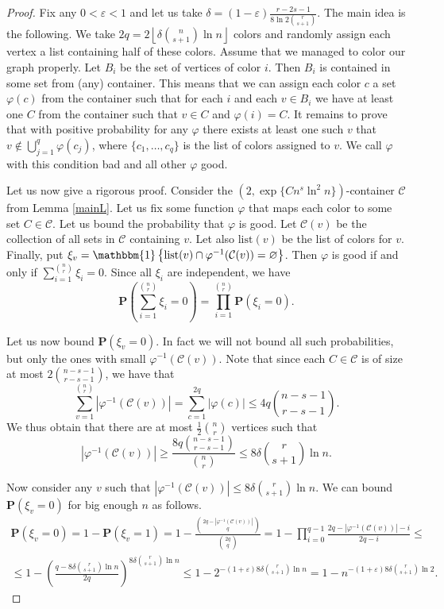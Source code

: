 \documentclass[10pt,a4paper]{article}
\theoremstyle{remark}
\theoremstyle{definition}
\newcommand{\mP}{\mathbf{P}}
\newcommand{\lst}{\mathrm{list}}
\newcommand{\ind}[1]{\mathbbm{1}\left\{#1\right\}}
\newcommand{\skob}[1]{\left(#1\right)}
\newcommand{\flr}[1]{\left\lfloor#1\right\rfloor}
\begin{document}
\begin{proof}
    Fix any $0 < \varepsilon < 1$ and let us take $\delta = (1-\varepsilon)\frac{r-2s-1}{8\ln 2\binom{r}{s+1}}$. The main idea is the following. We take $2q = 2\flr{\delta \binom{n}{s+1}\ln n}$ colors and randomly assign each vertex a list containing half of these colors. Assume that we managed to color our graph properly. Let $B_i$ be the set of vertices of color $i$. Then $B_i$ is contained in some set from (any) container. This means that we can assign each color $c$ a set $\varphi(c)$ from the container such that for each $i$ and each $v \in B_i$ we have at least one $C$ from the container such that $v \in C$ and $\varphi(i) = C$. It remains to prove that with positive probability for any $\varphi$ there exists at least one such $v$ that $v \notin \bigcup_{j = 1}^{q} \varphi(c_j)$, where $\{c_1, \dotsc, c_q\}$ is the list of colors assigned to $v$. We call $\varphi$ with this condition bad and all other $\varphi$ good.

    Let us now give a rigorous proof. Consider the $(2, \exp\{Cn^{s}\ln^2n\})$-container $\mathcal{C}$ from Lemma \ref{mainL}. Let us fix some function $\varphi$ that maps each color to some set $C \in \mathcal{C}$. Let us bound the probability that $\varphi$ is good. Let $\mathcal{C}(v)$ be the collection of all sets in $\mathcal{C}$ containing $v$. Let also $\lst(v)$ be the list of colors for $v$. Finally, put $\xi_v = \ind{\lst(v) \cap \varphi^{-1}(\mathcal{C}(v)) = \varnothing}$. Then $\varphi$ is good if and only if $\sum_{i =1}^{\binom{n}{r}}\xi_i = 0$. Since all $\xi_i$ are independent, we have
    $$
        \mP\skob{\sum_{i = 1}^{\binom{n}{r}}\xi_i = 0} = \prod_{i = 1}^{\binom{n}{r}}\mP(\xi_i = 0).
    $$

    Let us now bound $\mP(\xi_v = 0)$. In fact we will not bound all such probabilities, but only the ones with small $\varphi^{-1}(\mathcal{C}(v))$. Note that since each $C \in \mathcal{C}$ is of size at most $2\binom{n-s-1}{r-s-1}$, we have that 
    $$
    \sum_{v = 1}^{\binom{n}{r}}|\varphi^{-1}(\mathcal{C}(v))| = \sum_{c = 1}^{2q}|\varphi(c)| \leq 4q\binom{n-s-1}{r-s-1}.
    $$
    We thus obtain that there are at most $\frac{1}{2}\binom{n}{r}$ vertices such that 
    $$
    |\varphi^{-1}(\mathcal{C}(v))| \geq \frac{8q\binom{n-s-1}{r-s-1}}{\binom{n}{r}} \leq 8\delta\binom{r}{s+1}\ln n.
    $$

    Now consider any $v$ such that $|\varphi^{-1}(\mathcal{C}(v))| \leq 8\delta\binom{r}{s+1}\ln n$. We can bound $\mP(\xi_v = 0)$ for big enough $n$ as follows.
    \begin{multline*}
        \mP(\xi_v = 0) = 1- \mP(\xi_v = 1) = 1 -\frac{\binom{2q-|\varphi^{-1}(\mathcal{C}(v))|}{q}}{\binom{2q}{q}} = 1 -\prod_{i = 0}^{q-1}\frac{2q-|\varphi^{-1}(\mathcal{C}(v))| - i}{2q-i} \leq \\ \leq 1 - \skob{\frac{q -8\delta\binom{r}{s+1}\ln n}{2q}}^{8\delta\binom{r}{s+1}\ln n} \leq 1 - 2^{-(1+\varepsilon)8\delta\binom{r}{s+1}\ln n} = 1 - n^{-(1+\varepsilon)8\delta\binom{r}{s+1}\ln 2}. 
    \end{multline*}


\end{proof}
\end{document}
